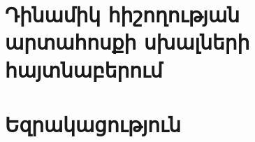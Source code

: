 \documentclass[a4paper, 12pt]{report}
\begin{document}
    \section{Դինամիկ հիշողության արտահոսքի սխալների հայտնաբերում}\label{sec:bugDetection}
    

    

    \clearpage
    \section*{Եզրակացություն}\label{sec:conclusion}
    

    \clearpage
    
    
\end{document}
